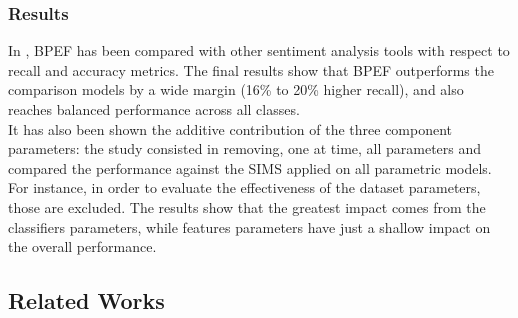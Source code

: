 \subsubsection{Results}

In \cite{Hassan2013TwitterSA}, BPEF has been compared with other sentiment analysis tools with respect to recall and accuracy metrics. The final results show that BPEF outperforms the comparison models by a wide margin (16\% to 20\% higher recall), and also reaches balanced performance across all classes.\\
It has also been shown the additive contribution of the three component parameters: the study consisted in removing, one at time, all parameters and compared the performance against the SIMS applied on all parametric models. For instance, in order to evaluate the effectiveness of the dataset parameters, those are excluded. The results show that the greatest impact comes from the classifiers parameters, while features parameters have just a shallow impact on the overall performance.


\subsection{Related Works}

